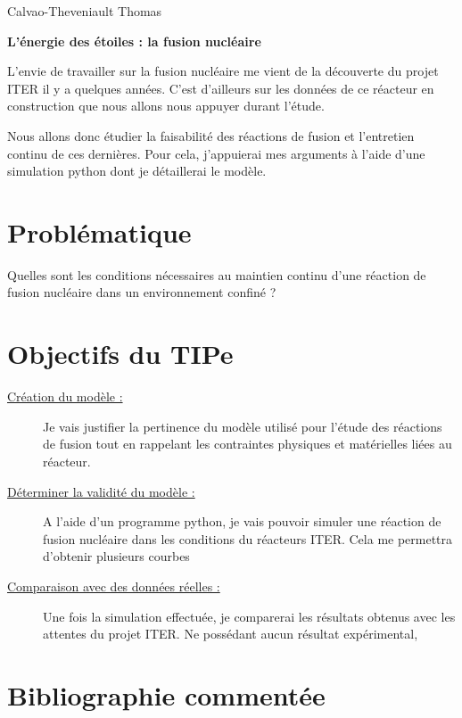 \documentclass{article}
\begin{document}
Calvao-Theveniault Thomas
\medskip
\begin{center}
    \Large{\textbf{L'énergie des étoiles : la fusion nucléaire}}
\end{center}
\medskip

L'envie de travailler sur la fusion nucléaire me vient de la découverte du projet ITER il y a quelques années. C'est d'ailleurs sur les données de ce réacteur en construction que nous allons nous appuyer durant l'étude. \bigskip

Nous allons donc étudier la faisabilité des réactions de fusion et l'entretien continu de ces dernières. Pour cela, j'appuierai mes arguments à l'aide d'une simulation python dont je détaillerai le modèle.

\section*{Problématique}

Quelles sont les conditions nécessaires au maintien continu d'une réaction de fusion nucléaire dans un environnement confiné ?

\section*{Objectifs du TIPe}

\begin{description}
    \item[\underline{Création du modèle :}] Je vais justifier la pertinence du modèle utilisé pour l'étude des réactions de fusion tout en rappelant les contraintes physiques et matérielles liées au réacteur.
    \item[\underline{Déterminer la validité du modèle :}] A l'aide d'un programme python, je vais pouvoir simuler une réaction de fusion nucléaire dans les conditions du réacteurs ITER. Cela me permettra d'obtenir plusieurs courbes
    \item[\underline{Comparaison avec des données réelles :}] Une fois la simulation effectuée, je comparerai les résultats obtenus avec les attentes du projet ITER. Ne possédant aucun résultat expérimental, 
\end{description}

\section*{Bibliographie commentée}
\end{document}
